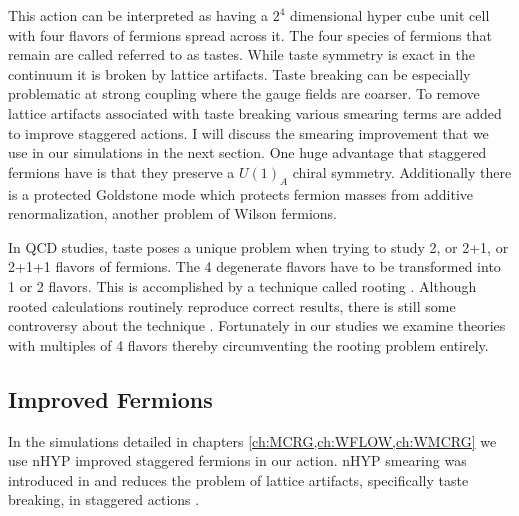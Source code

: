 This action can be interpreted as having a $2^4$ dimensional hyper cube unit cell with four flavors of fermions spread across it.
The four species of fermions that remain are called referred to as tastes.
While taste symmetry is exact in the continuum it is broken by lattice artifacts.
Taste breaking can be especially problematic at strong coupling where the gauge fields are coarser.
To remove lattice artifacts associated with taste breaking various smearing terms are added to improve staggered actions.
I will discuss the smearing improvement that we use in our simulations in the next section.
One huge advantage that staggered fermions have is that they preserve a $U(1)_A$ chiral symmetry.
Additionally there is a protected Goldstone mode which protects fermion masses from additive renormalization, another problem of Wilson fermions.

In QCD studies, taste poses a unique problem when trying to study 2, or 2+1, or 2+1+1 flavors of fermions.
The 4 degenerate flavors have to be transformed into 1 or 2 flavors.
This is accomplished by a technique called rooting \cite{PhysRevD.72.114512}.
Although rooted calculations routinely reproduce correct results, there is still some controversy about the technique \cite{Creutz2007230,Creutz2007241,Kronfeld:2007ek}.
Fortunately in our studies we examine theories with multiples of 4 flavors thereby circumventing the rooting problem entirely.

\subsection{Improved Fermions}

In the simulations detailed in chapters \ref{ch:MCRG,ch:WFLOW,ch:WMCRG} we use nHYP improved staggered fermions in our action.
nHYP smearing was introduced in \cite{Hasenfratz:2007rf} and reduces the problem of lattice artifacts, specifically taste breaking, in staggered actions \cite{Hasenfratz:2001tw}.


